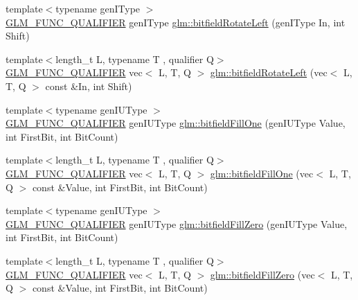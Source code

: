 \begin{DoxyCompactItemize}
\item 
{\footnotesize template$<$typename gen\+I\+Type $>$ }\\\mbox{\hyperlink{setup_8hpp_a33fdea6f91c5f834105f7415e2a64407}{G\+L\+M\+\_\+\+F\+U\+N\+C\+\_\+\+Q\+U\+A\+L\+I\+F\+I\+ER}} gen\+I\+Type \mbox{\hyperlink{namespaceglm_ae088d9983f8cb8fcf0aacae4ae51462a}{glm\+::bitfield\+Rotate\+Left}} (gen\+I\+Type In, int Shift)
\item 
{\footnotesize template$<$length\+\_\+t L, typename T , qualifier Q$>$ }\\\mbox{\hyperlink{setup_8hpp_a33fdea6f91c5f834105f7415e2a64407}{G\+L\+M\+\_\+\+F\+U\+N\+C\+\_\+\+Q\+U\+A\+L\+I\+F\+I\+ER}} vec$<$ L, T, Q $>$ \mbox{\hyperlink{group__gtc__bitfield_gae186317091b1a39214ebf79008d44a1e}{glm\+::bitfield\+Rotate\+Left}} (vec$<$ L, T, Q $>$ const \&In, int Shift)
\item 
{\footnotesize template$<$typename gen\+I\+U\+Type $>$ }\\\mbox{\hyperlink{setup_8hpp_a33fdea6f91c5f834105f7415e2a64407}{G\+L\+M\+\_\+\+F\+U\+N\+C\+\_\+\+Q\+U\+A\+L\+I\+F\+I\+ER}} gen\+I\+U\+Type \mbox{\hyperlink{group__gtc__bitfield_ga46f9295abe3b5c7658f5b13c7f819f0a}{glm\+::bitfield\+Fill\+One}} (gen\+I\+U\+Type Value, int First\+Bit, int Bit\+Count)
\item 
{\footnotesize template$<$length\+\_\+t L, typename T , qualifier Q$>$ }\\\mbox{\hyperlink{setup_8hpp_a33fdea6f91c5f834105f7415e2a64407}{G\+L\+M\+\_\+\+F\+U\+N\+C\+\_\+\+Q\+U\+A\+L\+I\+F\+I\+ER}} vec$<$ L, T, Q $>$ \mbox{\hyperlink{group__gtc__bitfield_ga3e96dd1f0a4bc892f063251ed118c0c1}{glm\+::bitfield\+Fill\+One}} (vec$<$ L, T, Q $>$ const \&Value, int First\+Bit, int Bit\+Count)
\item 
{\footnotesize template$<$typename gen\+I\+U\+Type $>$ }\\\mbox{\hyperlink{setup_8hpp_a33fdea6f91c5f834105f7415e2a64407}{G\+L\+M\+\_\+\+F\+U\+N\+C\+\_\+\+Q\+U\+A\+L\+I\+F\+I\+ER}} gen\+I\+U\+Type \mbox{\hyperlink{group__gtc__bitfield_ga697b86998b7d74ee0a69d8e9f8819fee}{glm\+::bitfield\+Fill\+Zero}} (gen\+I\+U\+Type Value, int First\+Bit, int Bit\+Count)
\item 
{\footnotesize template$<$length\+\_\+t L, typename T , qualifier Q$>$ }\\\mbox{\hyperlink{setup_8hpp_a33fdea6f91c5f834105f7415e2a64407}{G\+L\+M\+\_\+\+F\+U\+N\+C\+\_\+\+Q\+U\+A\+L\+I\+F\+I\+ER}} vec$<$ L, T, Q $>$ \mbox{\hyperlink{group__gtc__bitfield_ga0d16c9acef4be79ea9b47c082a0cf7c2}{glm\+::bitfield\+Fill\+Zero}} (vec$<$ L, T, Q $>$ const \&Value, int First\+Bit, int Bit\+Count)

\end{DoxyCompactItemize}
